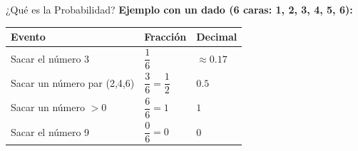 \documentclass[12pt, letterpaper]{article}
\begin{document}
\begin{concepto}{¿Qué es la Probabilidad?}
		\vspace{0.4cm}
		\textbf{Ejemplo con un dado (6 caras: 1, 2, 3, 4, 5, 6):}
		
		\begin{center}
			\renewcommand{\arraystretch}{1.5}
			\begin{tabular}{|m{5cm}|m{2.5cm}|m{3.5cm}|}
				\hline
				\rowcolor{valpurple!15}
				\textbf{Evento} & \textbf{Fracción} & \textbf{Decimal} \\
				\hline
				Sacar el número 3 &
				$\dfrac{1}{6}$ & $\approx 0.17$ \\
				\hline
				Sacar un número par (2,4,6) &
				$\dfrac{3}{6} = \dfrac{1}{2}$ & $0.5$ \\
				\hline
				Sacar un número $> 0$ &
				$\dfrac{6}{6} = 1$ & $1$ \\
				\hline
				Sacar el número 9 &
				$\dfrac{0}{6} = 0$ & $0$ \\
				\hline
			\end{tabular}
		\end{center}
	\end{concepto}
	
\end{document}
